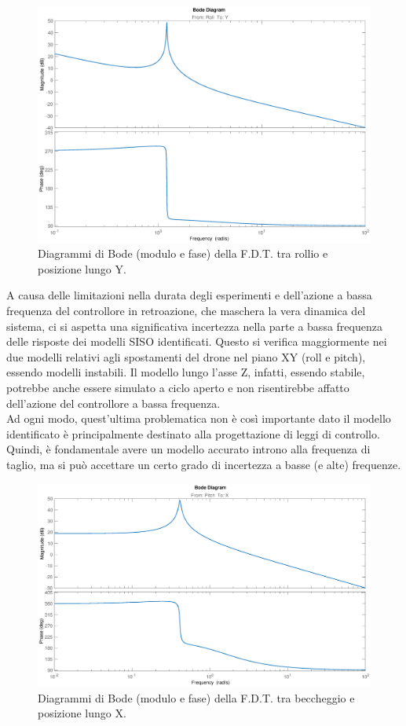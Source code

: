 \begin{figure}[H]
	\centering
	\includegraphics[width=1\textwidth]{gfx/SysId/rybode}
	\caption[Diagrammi di Bode F.D.T. Rollio e posizione lungo Y.]{Diagrammi di Bode (modulo e fase) della F.D.T. tra rollio e posizione lungo Y.}
	\label{fig:ry_freq}
\end{figure}

A causa delle limitazioni nella durata degli esperimenti e dell'azione a bassa frequenza del controllore in retroazione, che maschera la vera dinamica del sistema, ci si aspetta una significativa incertezza nella parte a bassa frequenza delle risposte dei modelli \acs{SISO} identificati. Questo si verifica maggiormente nei due modelli relativi agli spostamenti del drone nel piano XY (roll e pitch), essendo modelli instabili. Il modello lungo l'asse Z, infatti, essendo stabile, potrebbe anche essere simulato a ciclo aperto e non risentirebbe affatto dell'azione del controllore a bassa frequenza.\\

Ad ogni modo, quest'ultima problematica non è così importante dato il modello identificato è principalmente destinato alla progettazione di leggi di controllo. Quindi, è fondamentale avere un modello accurato introno alla frequenza di taglio, ma si può accettare un certo grado di incertezza a basse (e alte) frequenze.

\begin{figure}[H]
	\centering
	\includegraphics[width=1\textwidth]{gfx/SysId/pxbode}
	\caption[Diagrammi di Bode F.D.T. Beccheggio e posizione lungo X.]{Diagrammi di Bode (modulo e fase) della F.D.T. tra beccheggio e posizione lungo X.}
	\label{fig:px_freq}
\end{figure}
